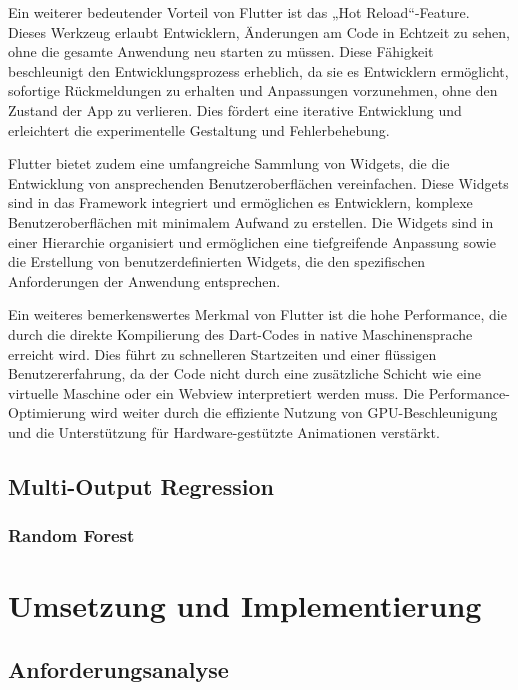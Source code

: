 \documentclass[oneside]{ausarbeitung}
\begin{document}
Ein weiterer bedeutender Vorteil von Flutter ist das „Hot Reload“-Feature. Dieses Werkzeug erlaubt Entwicklern, Änderungen am Code in Echtzeit zu sehen, ohne die gesamte Anwendung neu starten zu müssen. Diese Fähigkeit beschleunigt den Entwicklungsprozess erheblich, da sie es Entwicklern ermöglicht, sofortige Rückmeldungen zu erhalten und Anpassungen vorzunehmen, ohne den Zustand der App zu verlieren. Dies fördert eine iterative Entwicklung und erleichtert die experimentelle Gestaltung und Fehlerbehebung.

Flutter bietet zudem eine umfangreiche Sammlung von Widgets, die die Entwicklung von ansprechenden Benutzeroberflächen vereinfachen. Diese Widgets sind in das Framework integriert und ermöglichen es Entwicklern, komplexe Benutzeroberflächen mit minimalem Aufwand zu erstellen. Die Widgets sind in einer Hierarchie organisiert und ermöglichen eine tiefgreifende Anpassung sowie die Erstellung von benutzerdefinierten Widgets, die den spezifischen Anforderungen der Anwendung entsprechen.

Ein weiteres bemerkenswertes Merkmal von Flutter ist die hohe Performance, die durch die direkte Kompilierung des Dart-Codes in native Maschinensprache erreicht wird. Dies führt zu schnelleren Startzeiten und einer flüssigen Benutzererfahrung, da der Code nicht durch eine zusätzliche Schicht wie eine virtuelle Maschine oder ein Webview interpretiert werden muss. Die Performance-Optimierung wird weiter durch die effiziente Nutzung von GPU-Beschleunigung und die Unterstützung für Hardware-gestützte Animationen verstärkt.

\section{Multi-Output Regression}
\label{sec:foundations_multioutputregression}

\subsection*{Random Forest}

\chapter{Umsetzung und Implementierung}
\label{cha:implement}

\section{Anforderungsanalyse}
\label{sec:implement_requirements}
\end{document}
